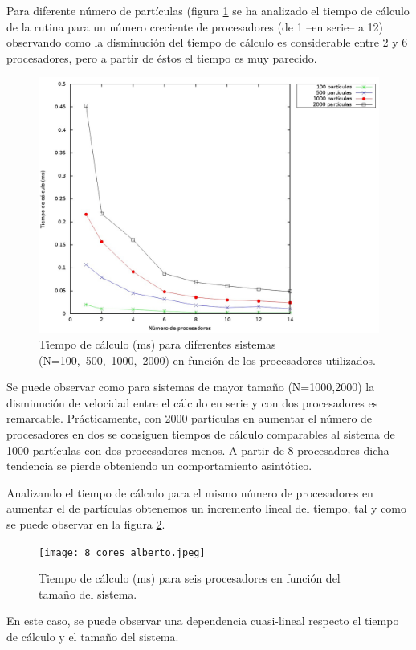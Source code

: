 \documentclass[onecolumn]{article}
\begin{document}
Para diferente número de partículas (figura \ref{fig: comparacion cores alberto} se ha analizado el tiempo de cálculo de la rutina para un número creciente de procesadores (de 1 --en serie-- a 12) observando como la disminución del tiempo de cálculo es considerable entre 2 y 6 procesadores, pero a partir de éstos el tiempo es muy parecido.
\begin{figure}
\includegraphics[scale=0.25]{velos_calc_alberto.jpeg} 
\caption{Tiempo de cálculo (ms) para diferentes sistemas (N=100,\ 500,\ 1000,\ 2000) en función de los procesadores utilizados.} 
\label{fig: comparacion cores alberto}
\end{figure}

Se puede observar como para sistemas de mayor tamaño (N=1000,2000) la disminución de velocidad entre el cálculo en serie y con dos procesadores es remarcable. Prácticamente, con 2000 partículas en aumentar el número de procesadores en dos se consiguen tiempos de cálculo comparables al sistema de 1000 partículas con dos procesadores menos. A partir de 8 procesadores dicha tendencia se pierde obteniendo un comportamiento asintótico.

Analizando el tiempo de cálculo para el mismo número de procesadores en aumentar el de partículas obtenemos un incremento lineal del tiempo, tal y como se puede observar en la figura \ref{fig: comparacionparticulasalberto}.
\begin{figure}[h!]
\texttt{[image: 8\_cores\_alberto.jpeg]} 
\caption{Tiempo de cálculo (ms) para seis procesadores en función del tamaño del sistema.} 
\label{fig: comparacionparticulasalberto}
\end{figure}
En este caso, se puede observar una dependencia cuasi-lineal respecto el tiempo de cálculo y el tamaño del sistema.
\end{document}

